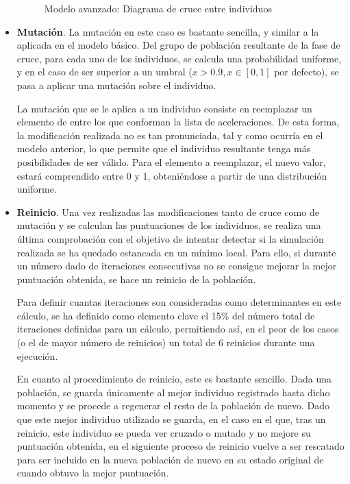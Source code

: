 \documentclass[11pt,spanish,listoffigures,listoftables]{tfgetsinf}
\begin{document}
\begin{itemize}
\begin{figure}[ht]
\caption{Modelo avanzado: Diagrama de cruce entre individuos}
\end{figure}

    \item \textbf{Mutación}. La mutación en este caso es bastante sencilla, y similar a la aplicada en el modelo básico. Del grupo de población resultante de la fase de cruce, para cada uno de los individuos, se calcula una probabilidad uniforme, y en el caso de ser superior a un umbral ($x>0.9, x \in [0,1]$ por defecto), se pasa a aplicar una mutación sobre el individuo.
    
    La mutación que se le aplica a un individuo consiste en reemplazar un elemento de entre los que conforman la lista de aceleraciones. De esta forma, la modificación realizada no es tan pronunciada, tal y como ocurría en el modelo anterior, lo que permite que el individuo resultante tenga más posibilidades de ser válido. Para el elemento a reemplazar, el nuevo valor, estará comprendido entre 0 y 1, obteniéndose a partir de una distribución uniforme.
    
    \item \textbf{Reinicio}. Una vez realizadas las modificaciones tanto de cruce como de mutación y se calculan las puntuaciones de los individuos, se realiza una última comprobación con el objetivo de intentar detectar si la simulación realizada se ha quedado estancada en un mínimo local. Para ello, si durante un número dado de iteraciones consecutivas no se consigue mejorar la mejor puntuación obtenida, se hace un reinicio de la población.
    
    Para definir cuantas iteraciones son consideradas como determinantes en este cálculo, se ha definido como elemento clave el 15\% del número total de iteraciones definidas para un cálculo, permitiendo así, en el peor de los casos (o el de mayor número de reinicios) un total de 6 reinicios durante una ejecución.
    
    En cuanto al procedimiento de reinicio, este es bastante sencillo. Dada una población, se guarda únicamente al mejor individuo registrado hasta dicho momento y se procede a regenerar el resto de la población de nuevo. Dado que este mejor individuo utilizado se guarda, en el caso en el que, tras un reinicio, este individuo se pueda ver cruzado o mutado y no mejore su puntuación obtenida, en el siguiente proceso de reinicio vuelve a ser rescatado para ser incluido en la nueva población de nuevo en su estado original de cuando obtuvo la mejor puntuación.
\end{itemize}
\end{document}
